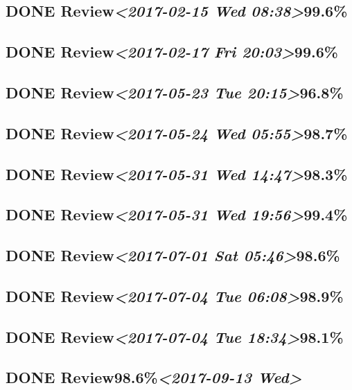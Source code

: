 \documentclass[11pt]{ctexart}
\begin{document}
\subsection{{\bfseries\sffamily DONE} Review\textit{<2017-02-15 Wed 08:38>}99.6\%}
\label{sec:org5d1ef62}
\subsection{{\bfseries\sffamily DONE} Review\textit{<2017-02-17 Fri 20:03>}99.6\%}
\label{sec:org4f4b987}
\subsection{{\bfseries\sffamily DONE} Review\textit{<2017-05-23 Tue 20:15>}96.8\%}
\label{sec:orgfe3a615}
\subsection{{\bfseries\sffamily DONE} Review\textit{<2017-05-24 Wed 05:55>}98.7\%}
\label{sec:org0c37a2e}
\subsection{{\bfseries\sffamily DONE} Review\textit{<2017-05-31 Wed 14:47>}98.3\%}
\label{sec:orgf900727}
\subsection{{\bfseries\sffamily DONE} Review\textit{<2017-05-31 Wed 19:56>}99.4\%}
\label{sec:orga905efb}
\subsection{{\bfseries\sffamily DONE} Review\textit{<2017-07-01 Sat 05:46>}98.6\%}
\label{sec:orgb48c05c}
\subsection{{\bfseries\sffamily DONE} Review\textit{<2017-07-04 Tue 06:08>}98.9\%}
\label{sec:org4429ab4}
\subsection{{\bfseries\sffamily DONE} Review\textit{<2017-07-04 Tue 18:34>}98.1\%}
\label{sec:org4e8d606}
\subsection{{\bfseries\sffamily DONE} Review98.6\%\textit{<2017-09-13 Wed>}}
\label{sec:org68bad72}
\end{document}
